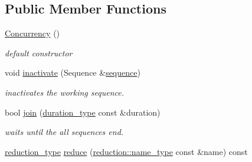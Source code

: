 \subsection*{Public Member Functions}
\begin{DoxyCompactItemize}
\item 
\hyperlink{classhryky_1_1task_1_1_concurrency_a53b1408cb51dd3a1894653fd83c5824e}{Concurrency} ()
\begin{DoxyCompactList}\small\item\em default constructor \end{DoxyCompactList}\item 
\hypertarget{classhryky_1_1task_1_1_concurrency_a8a4b9007de2f05ea345d9ea428294db9}{void \hyperlink{classhryky_1_1task_1_1_concurrency_a8a4b9007de2f05ea345d9ea428294db9}{inactivate} (Sequence \&\hyperlink{classhryky_1_1task_1_1_concurrency_aa82281dbb7df8aa9fcad2acb9ecb4531}{sequence})}\label{classhryky_1_1task_1_1_concurrency_a8a4b9007de2f05ea345d9ea428294db9}

\begin{DoxyCompactList}\small\item\em inactivates the working sequence. \end{DoxyCompactList}\item 
bool \hyperlink{classhryky_1_1task_1_1_concurrency_a8a1fc39c3672f169bd8036f4cd64d760}{join} (\hyperlink{namespacehryky_1_1task_ab22f4f47e2ef029ecd5373ffbaba40cf}{duration\-\_\-type} const \&duration)
\begin{DoxyCompactList}\small\item\em waits until the all sequences end. \end{DoxyCompactList}\item 
\hypertarget{classhryky_1_1task_1_1_concurrency_aae1a21906a197f2962b355e7e2bcf702}{\hyperlink{namespacehryky_a343a9a4c36a586be5c2693156200eadc}{reduction\-\_\-type} \hyperlink{classhryky_1_1task_1_1_concurrency_aae1a21906a197f2962b355e7e2bcf702}{reduce} (\hyperlink{namespacehryky_1_1reduction_ac686c30a4c8d196bbd0f05629a6b921f}{reduction\-::name\-\_\-type} const \&name) const }\label{classhryky_1_1task_1_1_concurrency_aae1a21906a197f2962b355e7e2bcf702}


\end{DoxyCompactItemize}
